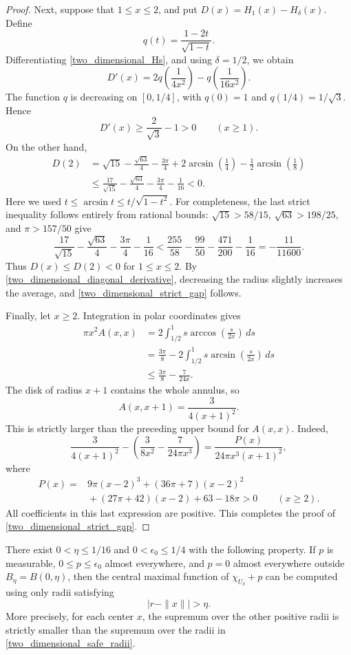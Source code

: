 \documentclass[12pt]{amsart}
\numberwithin{equation}{section}
\begin{document}
\begin{proof}
Next, suppose that $1\leq x\leq2$, and put
$D(x)=H_1(x)-H_\delta(x)$. Define
\[
q(t)=\frac{1-2t}{\sqrt{1-t}}.
\]
Differentiating \eqref{two_dimensional_Hs}, and using $\delta=1/2$,
we obtain
\[
D'(x)=2q\!\left(\frac{1}{4x^2}\right)
          -q\!\left(\frac{1}{16x^2}\right).
\]
The function $q$ is decreasing on $[0,1/4]$, with $q(0)=1$ and
$q(1/4)=1/\sqrt3$. Hence
\[
D'(x)\geq\frac{2}{\sqrt3}-1>0\qquad(x\geq1).
\]
On the other hand,
\begin{align*}
D(2)
&=\sqrt{15}-\frac{\sqrt{63}}4-\frac{3\pi}{4}
  +2\arcsin\!\left(\frac14\right)
  -\frac12\arcsin\!\left(\frac18\right)\\
&\leq\frac{17}{\sqrt{15}}-\frac{\sqrt{63}}4
      -\frac{3\pi}{4}-\frac1{16}<0.
\end{align*}
Here we used $t\leq\arcsin t\leq t/\sqrt{1-t^2}$.
For completeness, the last strict inequality follows entirely from
rational bounds: $\sqrt{15}>58/15$, $\sqrt{63}>198/25$, and
$\pi>157/50$ give
\[
\frac{17}{\sqrt{15}}-\frac{\sqrt{63}}4-\frac{3\pi}{4}-\frac1{16}
<\frac{255}{58}-\frac{99}{50}-\frac{471}{200}-\frac1{16}
=-\frac{11}{11600}.
\]
Thus $D(x)\leq D(2)<0$ for $1\leq x\leq2$. By
\eqref{two_dimensional_diagonal_derivative}, decreasing the radius
slightly increases the average, and \eqref{two_dimensional_strict_gap}
follows.

Finally, let $x\geq2$. Integration in polar coordinates gives
\begin{align*}
\pi x^2 A(x,x)
&=2\int_{1/2}^1 s\arccos\!\left(\frac{s}{2x}\right)\,ds\\
&=\frac{3\pi}{8}
  -2\int_{1/2}^1 s\arcsin\!\left(\frac{s}{2x}\right)\,ds\\
&\leq\frac{3\pi}{8}-\frac{7}{24x}.
\end{align*}
The disk of radius $x+1$ contains the whole annulus, so
\[
A(x,x+1)=\frac{3}{4(x+1)^2}.
\]
This is strictly larger than the preceding upper bound for $A(x,x)$.
Indeed,
\[
\frac{3}{4(x+1)^2}
-\left(\frac{3}{8x^2}-\frac{7}{24\pi x^3}\right)
=\frac{P(x)}{24\pi x^3(x+1)^2},
\]
where
\begin{align*}
P(x)={}&9\pi(x-2)^3+(36\pi+7)(x-2)^2\\
       &{}+(27\pi+42)(x-2)+63-18\pi>0
       \qquad(x\geq2).
\end{align*}
All coefficients in this last expression are positive. This completes
the proof of \eqref{two_dimensional_strict_gap}.
\end{proof}

\begin{lemma}
\label{two_dimensional_uniform_gap}
There exist $0<\eta\leq1/16$ and $0<\epsilon_0\leq1/4$ with the
following property. If $p$ is measurable, $0\leq p\leq\epsilon_0$
almost everywhere, and $p=0$ almost everywhere outside $B_\eta=B(0,\eta)$,
then the central maximal function of $\chi_{U_\delta}+p$ can be computed
using only radii satisfying
\begin{equation}
\label{two_dimensional_safe_radii}
\bigl|r-\|x\|\bigr|>\eta.
\end{equation}
More precisely, for each center $x$, the supremum over the other
positive radii is strictly smaller than the supremum over the radii
in \eqref{two_dimensional_safe_radii}.
\end{lemma}
\end{document}
